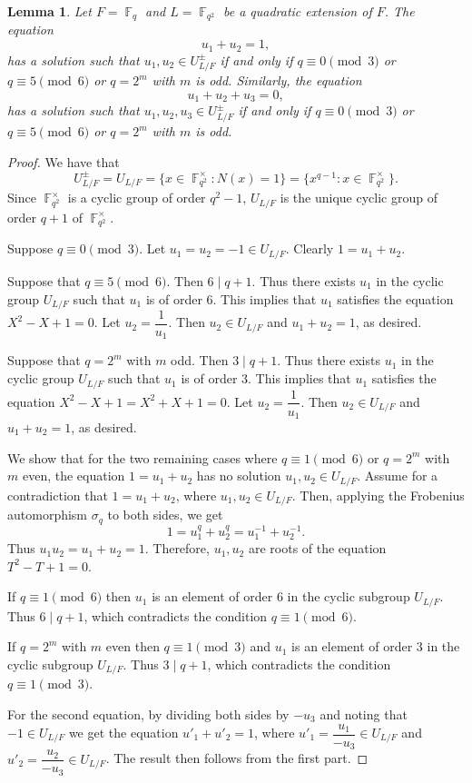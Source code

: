 \documentclass[11pt, a4paper]{amsart}
\newtheorem{lem}[thm]{Lemma}
\theoremstyle{definition}
\DeclareMathOperator{\F}{\mathbb{F}}
\numberwithin{equation}{section}
\begin{document}
\begin{lem} \label{lem:q=1 mod 6} Let $F=\F_q$ and  $L=\F_{q^2}$ be a quadratic extension of $F$.
     The equation 
    \[ u_1+u_2=1, \]
    has a solution such that $u_1, u_2 \in U^\pm_{L/F}$ if and only if  $q\equiv 0\pmod3$ or  $q \equiv 5 \pmod{6}$ or $q=2^m$ with $m$ is odd.  Similarly, the equation 
    \[   u_1+u_2+u_3=0, \]
has a solution such that $u_1, u_2, u_3 \in U^\pm_{L/F}$ if and only if $q\equiv 0\pmod3$ or $q \equiv 5 \pmod{6}$ or $q=2^m$ with $m$ is odd.
\end{lem}

\begin{proof}
We have that 
\[
U_{L/F}^\pm = U_{L/F}=\{x\in \F_{q^2}^\times: N(x)=1\}=\{x^{q-1}: x\in \F_{q^2}^\times\}.
\]
Since $\F_{q^2}^\times$ is a cyclic group of order $q^2-1$,  $U_{L/F}$ is the unique cyclic group of order $q+1$ of $\F_{q^2}^\times$.

  Suppose $q\equiv 0\pmod 3$. Let $u_1=u_2=-1\in U_{L/F}$. Clearly $1=u_1+u_2$.

  Suppose that $q\equiv 5\pmod 6$. Then $6\mid q+1$. Thus there exists $u_1$ in the cyclic group $U_{L/F}$ such that $u_1$ is of order 6. This implies that $u_1$ satisfies the equation $X^2-X+1=0$. Let $u_2=\dfrac{1}{u_1}$. Then $u_2\in U_{L/F}$ and $u_1+u_2=1$, as desired.

Suppose that $q=2^m$ with $m$ odd. Then $3\mid q+1$. Thus there exists $u_1$ in the cyclic group $U_{L/F}$ such that $u_1$ is of order 3. This implies that $u_1$ satisfies the equation $X^2-X+1=X^2+X+1=0$. Let $u_2=\dfrac{1}{u_1}$. Then $u_2\in U_{L/F}$ and $u_1+u_2=1$, as desired.

We show that for the two remaining cases where $q\equiv 1\pmod 6$ or $q=2^m$  with $m$ even, the equation $1=u_1+u_2$ has no solution $u_1,u_2\in U_{L/F}$. Assume for a contradiction that $1=u_1+u_2$, where $u_1,u_2\in U_{L/F}$.
   Then, applying the Frobenius automorphism $\sigma_q$ to both sides, we get 
    \[1=u_1^{q}+u_2^{q}=u_1^{-1}+u_2^{-1}.\]
    Thus $u_1u_2=u_1+u_2=1$. 
    Therefore, $u_1, u_2$ are roots of the equation $T^2-T+1=0.$
    


   If $q\equiv 1\pmod 6$  then $u_1$ is an element of order 6 in the cyclic subgroup $U_{L/F}$.
    Thus $6\mid q+1$, which contradicts the condition $q\equiv 1\pmod 6$.

   If $q=2^m$  with $m$ even then $q\equiv 1\pmod 3$  and $u_1$ is an element of order 3  in the cyclic subgroup $U_{L/F}$.
    Thus $3\mid q+1$, which contradicts the condition $q\equiv 1\pmod 3$.




    For the second equation, by dividing both sides by $-u_3$ and noting that $-1\in U_{L/F}$ we get the equation $u'_1+u'_2=1$, where $u'_1=\dfrac{u_1}{-u_3}\in U_{L/F}$ and $u'_2=\dfrac{u_2}{-u_3}\in U_{L/F}$. The result then follows from the first part. 
\end{proof}
\end{document}
